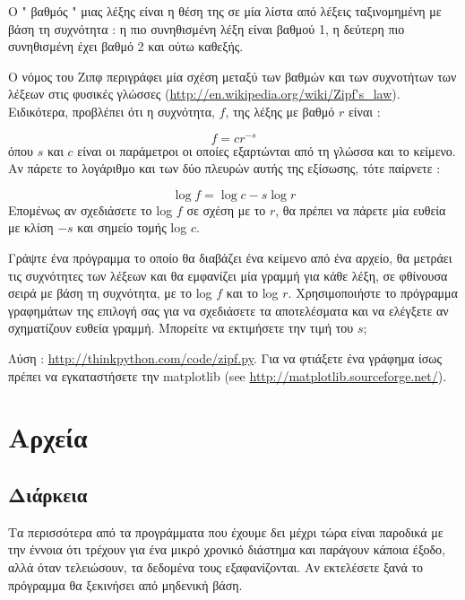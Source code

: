 \documentclass[10pt]{book}
\begin{document}
\begin{exercise}

Ο  " βαθμός "  μιας λέξης είναι η θέση της σε μία λίστα από λέξεις ταξινομημένη με βάση τη συχνότητα :  η πιο συνηθισμένη λέξη είναι βαθμού 1, η δεύτερη πιο συνηθισμένη έχει βαθμό 2 και ούτω καθεξής.

Ο νόμος του Ζιπφ περιγράφει μία σχέση μεταξύ των βαθμών και των συχνοτήτων των λέξεων 
στις φυσικές γλώσσες  (\url{http://en.wikipedia.org/wiki/Zipf's_law}).  Ειδικότερα, προβλέπει ότι η συχνότητα, $f$, της λέξης με βαθμό $r$ είναι :

\[ f = c r^{-s} \]
%
 όπου $s$ και $c$ είναι οι παράμετροι οι οποίες εξαρτώνται από τη γλώσσα και το κείμενο. Αν πάρετε το λογάριθμο και των δύο 
πλευρών αυτής της εξίσωσης, τότε παίρνετε :

\[ \log f = \log c - s \log r \]
%
 Επομένως αν σχεδιάσετε το  log $f$  σε σχέση με το  $r$,  θα πρέπει να πάρετε μία ευθεία με κλίση $-s$ και 
σημείο τομής  log $c$.

 Γράψτε ένα πρόγραμμα το οποίο θα διαβάζει ένα κείμενο από ένα αρχείο, θα μετράει τις συχνότητες των λέξεων και θα εμφανίζει 
μία γραμμή για κάθε λέξη, σε φθίνουσα σειρά με βάση τη συχνότητα, με το  log $f$  και το  log $r$.  Χρησιμοποιήστε το πρόγραμμα γραφημάτων της επιλογή σας για να σχεδιάσετε τα αποτελέσματα και να ελέγξετε αν σχηματίζουν ευθεία γραμμή. Μπορείτε να εκτιμήσετε την τιμή του  $s$;

 Λύση : \url{http://thinkpython.com/code/zipf.py}.  Για να φτιάξετε ένα γράφημα ίσως πρέπει να εγκαταστήσετε την  matplotlib (see \url{http://matplotlib.sourceforge.net/}).

\end{exercise}

 

\chapter{Αρχεία}


\section{Διάρκεια}

Τα περισσότερα από τα προγράμματα που έχουμε δει μέχρι τώρα είναι παροδικά με την έννοια 
ότι τρέχουν για ένα μικρό χρονικό διάστημα και παράγουν κάποια έξοδο, αλλά όταν τελειώσουν, τα δεδομένα τους εξαφανίζονται. Αν εκτελέσετε ξανά το πρόγραμμα θα ξεκινήσει από μηδενική βάση.
\end{document}
